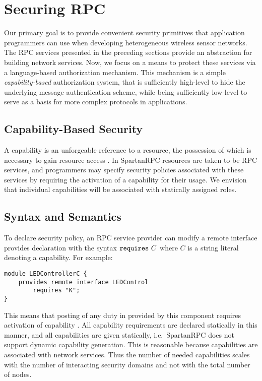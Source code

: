 \section{Securing RPC}
\label{section-security-extensions}

Our primary goal is to provide convenient security primitives that application programmers can
use when developing heterogeneous wireless sensor networks. The RPC services presented in the
preceding sections provide an abstraction for building network services. Now, we focus on a
means to protect these services via a language-based authorization mechanism. This mechanism is
a simple \emph{capability-based} authorization system, that is sufficiently high-level to hide
the underlying message authentication scheme, while being sufficiently low-level to serve as a
basis for more complex protocols in applications.

\subsection{Capability-Based Security}

A capability is an unforgeable reference to a resource, the possession of which is necessary to
gain resource access \cite{884422}. In SpartanRPC resources are taken to be RPC services, and
programmers may specify security policies associated with these services by requiring the
activation of a capability for their usage. We envision that individual capabilities will
be associated with statically assigned roles.

\subsection{Syntax and Semantics}

To declare security policy, an RPC service provider can modify a remote interface provides
declaration with the syntax $\code{requires}\ C$ where $C$ is a string literal denoting a
capability. For example:
\begin{Verbatim}
module LEDControllerC {
    provides remote interface LEDControl
        requires "K";
}
\end{Verbatim}
This means that posting of any duty in  provided by this component requires
activation of capability . All capability requirements are declared statically in this
manner, and all capabilities are given statically, i.e.~SpartanRPC does not support dynamic
capability generation. This is reasonable because capabilities are associated with network
services. Thus the number of needed capabilities scales with the number of interacting security
domains and not with the total number of nodes.

